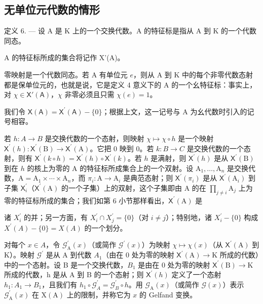 \subsection{无单位元代数的情形}

定义 6. --- 设 A 是 K 上的一个交换代数。A 的特征标是指从 A 到 K 的一个代数同态。

A 的特征标所成的集合将记作 X'(A)。

零映射是一个代数同态。若 A 有单位元 \(e\)，则从 A 到 K 中的每个非零代数态射都是保单位元的，也就是说，它是定义 4 意义下的 A 的一个幺特征标：事实上，对 \(\chi \in \mathsf{X}'(\mathsf{A})\)，\(\chi\) 非零必须且只需 \(\chi(e) = 1\)。

我们令 \(\mathsf{X}(\mathsf{A})=\mathsf{X}^{\prime}(\mathsf{A})-\{0\}\)；根据上文，这一记号与 A 为幺代数时引入的记号相容。

若 \(h\colon A\to B\) 是交换代数的一个态射，则映射 \(\chi\mapsto\chi\circ h\) 是一个映射 \(\mathsf{X}^{\prime}(h)\colon\mathsf{X}^{\prime}(\mathrm{B})\to\mathsf{X}^{\prime}(\mathrm{A})\)。它把 0 映到 0。若 \(k\colon B\to C\) 是交换代数的一个态射，则有 \(\mathsf{X}^{\prime}(k\circ h)=\mathsf{X}^{\prime}(h)\circ\mathsf{X}^{\prime}(k)\)。若 \(h\) 是满射，则 \(\mathsf{X}^{\prime}(h)\) 是从 \(\mathsf{X}^{\prime}(\mathrm{B})\) 到在 \(h\) 的核上为零的 A 的特征标所成集合上的一个双射。设 \(\mathrm{A}_{1},\ldots,\mathrm{A}_{n}\) 是交换代数，\(\mathrm{A}=\mathrm{A}_{1}\times\cdots\times\mathrm{A}_{n}\)，而 \(\pi_{i}\colon\mathrm{A}\to\mathrm{A}_{i}\) 是典范态射；则 \(\mathsf{X}^{\prime}(\pi_{i})\) 是从 \(\mathsf{X}^{\prime}(\mathrm{A}_{i})\) 到子集 \(\mathsf{X}_{i}^{\prime}\)（\(\mathsf{X}^{\prime}(\mathrm{A})\) 的一个子集）上的双射，这个子集即由 A 的在 \(\prod_{j\neq i}\mathrm{A}_{j}\) 上为零的特征标所成的集合；我们如第 6 小节那样看出，\(\mathsf{X}^{\prime}(\mathrm{A})\) 是

诸 \(X_{i}^{\prime}\) 的并；另一方面，有 \(X_{i}^{\prime} \cap X_{j}^{\prime} = \{0\}\)（对 \(i \neq j\)）；特别地，诸 \(X_{i}^{\prime} - \{0\}\) 构成 \(X^{\prime}(A) - \{0\} = X(A)\) 的一个划分。

对每个 \(x \in A\)，令 \(\mathcal{G}_{\mathrm{A}}^{\prime}(x)\)（或简作 \(\mathcal{G}^{\prime}(x)\)）为映射 \(\chi \mapsto \chi(x)\)（从 \(\mathsf{X}^{\prime}(\mathrm{A})\) 到 K）。映射 \(\mathcal{G}^{\prime}\) 是从 A 到代数 \(A_{1}\)（由在 0 处为零的映射 \(\mathsf{X}^{\prime}(\mathrm{A}) \to \mathrm{K}\) 所成的代数）中的一个态射。设 B 是一个交换代数，\(B_{1}\) 是由在 0 处为零的映射 \(\mathsf{X}^{\prime}(\mathrm{B}) \to \mathrm{K}\) 所成的代数，h 是从 A 到 B 的一个态射；则 \(\mathsf{X}^{\prime}(h)\) 定义了一个态射 \(h_{1}: A_{1} \to B_{1}\)，且我们有 \(h_{1} \circ \mathcal{G}_{A}^{\prime} = \mathcal{G}_{B}^{\prime} \circ h\)。用 \(\mathcal{G}_{\mathrm{A}}(x)\)（或简作 \(\mathcal{G}(x)\)）表示 \(\mathcal{G}_{\mathrm{A}}^{\prime}(x)\) 在 \(\mathrm{X}(\mathrm{A})\) 上的限制，并称它为 \(x\) 的 Gelfand 变换。


